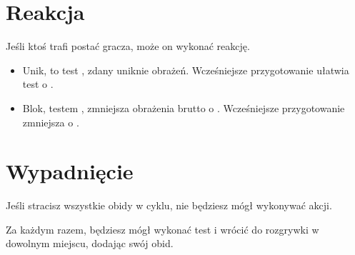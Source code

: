 \section{Reakcja}
Jeśli ktoś trafi postać gracza, może on wykonać reakcję.
\begin{itemize}
	\item Unik, to test \aba{}, zdany uniknie obrażeń. Wcześniejsze przygotowanie ułatwia test o \diiii{}.
	\item Blok, testem \abs{}, zmniejsza obrażenia brutto o \dvi{}. Wcześniejsze przygotowanie zmniejsza o \dx{}.
\end{itemize}

\section{Wypadnięcie}
Jeśli stracisz wszystkie obidy w cyklu, nie będziesz mógł wykonywać akcji.

Za każdym razem, będziesz mógł wykonać test \abp{} i wrócić do rozgrywki w dowolnym miejscu, dodając swój obid.


